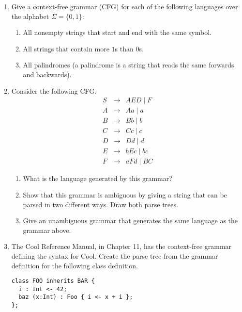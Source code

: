 \documentclass[11pt]{article}
\begin{document}
\begin{enumerate}

\item
Give a context-free grammar (CFG) for each of the following languages
over the alphabet $\Sigma = \{0, 1\}$:
\begin{enumerate}
\item All nonempty strings that start and end with the same symbol.
\item All strings that contain more $1$s than $0$s.
\item All palindromes (a palindrome is a string that reads the same
forwards and backwards).
\end{enumerate}

\item Consider the following CFG.
\begin{eqnarray*}
S & \rightarrow & AED \mid F \\
A & \rightarrow & Aa \mid a \\
B & \rightarrow & Bb \mid b \\
C & \rightarrow & Cc \mid c \\
D & \rightarrow & Dd \mid d \\
E & \rightarrow & bEc \mid bc \\
F & \rightarrow & aFd \mid BC
\end{eqnarray*}

\begin{enumerate}

\item What is the language generated by this grammar?

\item Show that this grammar is ambiguous by giving a string that can
be parsed in two different ways.  Draw both parse trees.

\item Give an unambiguous grammar that generates the same language as
the grammar above.

\end{enumerate}

\item The Cool Reference Manual, in Chapter 11, has the context-free
grammar defining the syntax for Cool.  Create the parse tree from the
grammar definition for the following class definition.

\begin{verbatim}
class FOO inherits BAR {
  i : Int <- 42;
  baz (x:Int) : Foo { i <- x + i }; 
};
\end{verbatim}


\end{enumerate}
\end{document}
